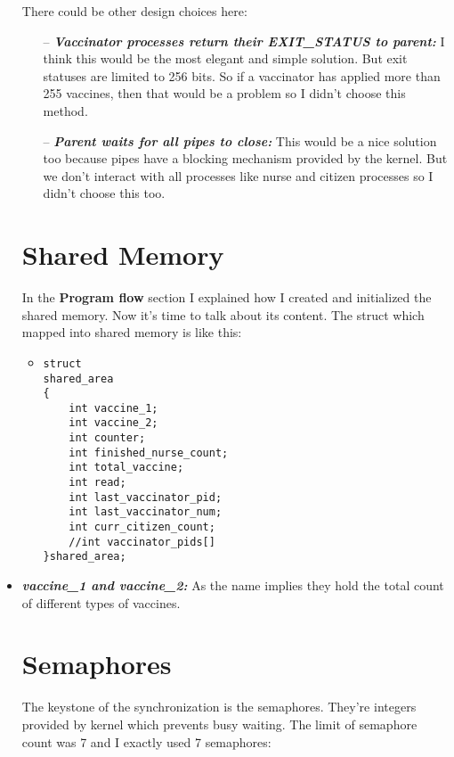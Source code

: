 \documentclass{article}
\begin{document}
\begin{itemize}
\begin{itemize}
\begin{lstlisting}
    \end{lstlisting}
\end{itemize}
There could be other design choices here:

\begin{itemize}
\item[--] \textbf{\textit{Vaccinator processes return their EXIT\_STATUS to parent:}}
I think this would be the most elegant and simple solution. But exit statuses are limited to 256 bits. So if a vaccinator has applied more than 255 vaccines, then that would be a problem so I didn't choose this method.
\item[--] \textbf{\textit{Parent waits for all pipes to close:}}
This would be a nice solution too because pipes have a blocking mechanism provided by the kernel. But we don't interact with all processes like nurse and citizen processes so I didn't choose this too.
\end{itemize}

\newpage
\section{Shared Memory}

\quad In the \textbf{Program flow} section I explained how I created and initialized the shared memory. Now it's time to talk about its content. The struct which mapped into shared memory is like this:
\begin{itemize}
  \item 
    \begin{lstlisting}
struct 
shared_area 
{
    int vaccine_1;
    int vaccine_2;
    int counter;
    int finished_nurse_count;
    int total_vaccine;
    int read;
    int last_vaccinator_pid;
    int last_vaccinator_num;
    int curr_citizen_count;
    //int vaccinator_pids[]
}shared_area;

    \end{lstlisting}
\end{itemize}

\item \textbf{\textit{vaccine\_1 and vaccine\_2:}} As the name implies they hold the total count of different types of vaccines. 



\section{Semaphores}
\quad The keystone of the synchronization is the semaphores. They're integers provided by kernel which prevents busy waiting. The limit of semaphore count was 7 and I exactly used 7 semaphores:\newline 


\end{itemize}
\end{document}
